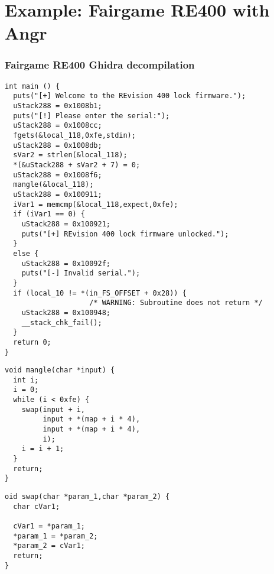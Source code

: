 \documentclass[aspectratio=169]{beamer}
\begin{document}
\section{Example: Fairgame RE400 with Angr}
\begin{frame}[fragile]
\frametitle{Fairgame RE400 Ghidra decompilation}
\begin{minipage}{0.5\textwidth}
\begin{Verbatim}[frame=single, fontsize=\tiny]
int main () {
  puts("[+] Welcome to the REvision 400 lock firmware.");
  uStack288 = 0x1008b1;
  puts("[!] Please enter the serial:");
  uStack288 = 0x1008cc;
  fgets(&local_118,0xfe,stdin);
  uStack288 = 0x1008db;
  sVar2 = strlen(&local_118);
  *(&uStack288 + sVar2 + 7) = 0;
  uStack288 = 0x1008f6;
  mangle(&local_118);
  uStack288 = 0x100911;
  iVar1 = memcmp(&local_118,expect,0xfe);
  if (iVar1 == 0) {
    uStack288 = 0x100921;
    puts("[+] REvision 400 lock firmware unlocked.");
  }
  else {
    uStack288 = 0x10092f;
    puts("[-] Invalid serial.");
  }
  if (local_10 != *(in_FS_OFFSET + 0x28)) {
                    /* WARNING: Subroutine does not return */
    uStack288 = 0x100948;
    __stack_chk_fail();
  }
  return 0;
}
\end{Verbatim}
\end{minipage}
\begin{minipage}{0.49\textwidth}
\begin{Verbatim}[frame=single, fontsize=\tiny]
void mangle(char *input) {
  int i;
  i = 0;
  while (i < 0xfe) {
    swap(input + i,
         input + *(map + i * 4),
         input + *(map + i * 4),
         i);
    i = i + 1;
  }
  return;
}
\end{Verbatim}
\begin{Verbatim}[frame=single, fontsize=\tiny]
oid swap(char *param_1,char *param_2) {
  char cVar1;
  
  cVar1 = *param_1;
  *param_1 = *param_2;
  *param_2 = cVar1;
  return;
}
\end{Verbatim}
\end{minipage}
\end{frame}
\end{document}
